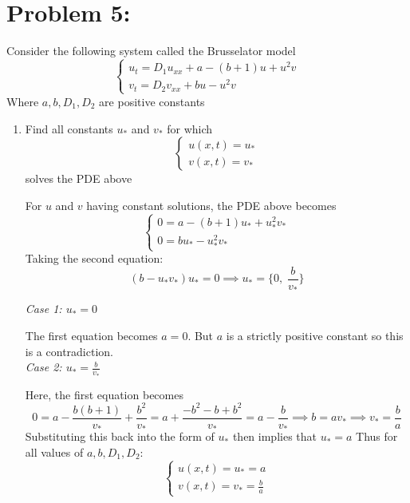 \documentclass[12pt]{article}
\begin{document}
\pagebreak 
\section*{Problem 5:} Consider the following system
called the Brusselator model
\[\begin{cases}
    u_t = D_1u_{xx} + a - (b + 1)u + u^2v\\
    v_t = D_2v_{xx} + bu - u^2v
\end{cases}\]
Where $a, b, D_1, D_2$ are positive constants 

\begin{enumerate}
    \item Find all constants $u_*$ and $v_*$ for which 
    \[\begin{cases}
        u(x, t) = u_*\\
        v(x, t) = v_*
    \end{cases}\]
    solves the PDE above 

    \color{blue}
    For $u$ and $v$ having constant solutions, the PDE above becomes 
    \[\begin{cases}
        0 = a - (b+1)u_* + u_*^2 v_*\\
        0 = bu_* - u_*^2 v_*
    \end{cases}\]
    Taking the second equation:
    \[(b - u_* v_*)u_* = 0 \implies u_* = \{0,\; \frac{b}{v_*}\}\]

    \emph{Case 1: $u_* = 0$}

    The first equation becomes $a = 0$. But $a$ is a strictly positive constant so this is a contradiction.\\
    
    \emph{Case 2: $u_* = \frac{b}{v_*}$}

    Here, the first equation becomes 
    \[0 = a - \frac{b(b + 1)}{v_*} + \frac{b^2}{v_*} = a + \frac{-b^2 - b + b^2}{v_*} = a - \frac{b}{v_*} \implies b = av_* \implies v_* = \frac{b}{a}\]
    Substituting this back into the form of $u_*$ then implies that $u_* = a$
    Thus for all values of $a, b, D_1, D_2$:
    \[\boxed{\begin{cases}
        u(x, t) = u_*  = a\\
        v(x, t) = v_* = \frac{b}{a}
    \end{cases}}\]
    \color{black}
    \pagebreak


\end{enumerate}
\end{document}
